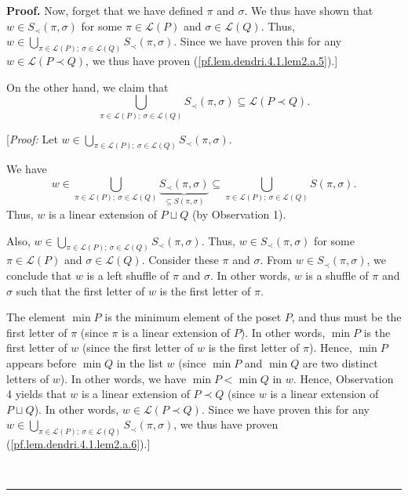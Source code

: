 \documentclass[numbers=enddot,12pt,final,onecolumn,notitlepage]{scrartcl}%
\theoremstyle{definition}
\newenvironment{proof}[1][Proof]{\noindent\textbf{#1.} }{\ \rule{0.5em}{0.5em}}
\newenvironment{verlong}{}{}
\begin{document}
\begin{verlong}
\begin{proof}
Now, forget that we have defined $\pi$ and $\sigma$. We thus have shown that
$w\in S_{\prec}\left(  \pi,\sigma\right)  $ for some $\pi\in\mathcal{L}\left(
P\right)  $ and $\sigma\in\mathcal{L}\left(  Q\right)  $. Thus, $w\in
\bigcup_{\pi\in\mathcal{L}\left(  P\right)  ;\ \sigma\in\mathcal{L}\left(
Q\right)  }S_{\prec}\left(  \pi,\sigma\right)  $. Since we have proven this
for any $w\in\mathcal{L}\left(  P\left.  \prec\right.  Q\right)  $, we thus
have proven (\ref{pf.lem.dendri.4.1.lem2.a.5}).]

On the other hand, we claim that
\begin{equation}
\bigcup_{\pi\in\mathcal{L}\left(  P\right)  ;\ \sigma\in\mathcal{L}\left(
Q\right)  }S_{\prec}\left(  \pi,\sigma\right)  \subseteq\mathcal{L}\left(
P\left.  \prec\right.  Q\right)  .\label{pf.lem.dendri.4.1.lem2.a.6}%
\end{equation}


[\textit{Proof:} Let $w\in\bigcup_{\pi\in\mathcal{L}\left(  P\right)
;\ \sigma\in\mathcal{L}\left(  Q\right)  }S_{\prec}\left(  \pi,\sigma\right)
$.

We have%
\[
w\in\bigcup_{\pi\in\mathcal{L}\left(  P\right)  ;\ \sigma\in\mathcal{L}\left(
Q\right)  }\underbrace{S_{\prec}\left(  \pi,\sigma\right)  }_{\subseteq
S\left(  \pi,\sigma\right)  }\subseteq\bigcup_{\pi\in\mathcal{L}\left(
P\right)  ;\ \sigma\in\mathcal{L}\left(  Q\right)  }S\left(  \pi
,\sigma\right)  .
\]
Thus, $w$ is a linear extension of $P\sqcup Q$ (by Observation 1).

Also, $w\in\bigcup_{\pi\in\mathcal{L}\left(  P\right)  ;\ \sigma
\in\mathcal{L}\left(  Q\right)  }S_{\prec}\left(  \pi,\sigma\right)  $.
Thus, $w\in S_{\prec}\left(  \pi,\sigma\right)  $ for some $\pi\in
\mathcal{L}\left(  P\right)  $ and $\sigma\in\mathcal{L}\left(  Q\right)  $.
Consider these $\pi$ and $\sigma$. From $w\in S_{\prec}\left(  \pi
,\sigma\right)  $, we conclude that $w$ is a left shuffle of $\pi$ and
$\sigma$. In other words, $w$ is a shuffle of $\pi$ and $\sigma$ such that the
first letter of $w$ is the first letter of $\pi$.

The element $\min P$ is the minimum element of the poset $P$, and thus must be
the first letter of $\pi$ (since $\pi$ is a linear extension of $P$). In other
words, $\min P$ is the first letter of $w$ (since the first letter of $w$ is
the first letter of $\pi$). Hence, $\min P$ appears before $\min Q$ in the
list $w$ (since $\min P$ and $\min Q$ are two distinct letters of $w$). In
other words, we have $\min P<\min Q$ in $w$. Hence, Observation 4 yields that
$w$ is a linear extension of $P\left.  \prec\right.  Q$ (since $w$ is a linear
extension of $P\sqcup Q$). In other words, $w\in\mathcal{L}\left(  P\left.
\prec\right.  Q\right)  $. Since we have proven this for any $w\in\bigcup
_{\pi\in\mathcal{L}\left(  P\right)  ;\ \sigma\in\mathcal{L}\left(  Q\right)
}S_{\prec}\left(  \pi,\sigma\right)  $, we thus have proven
(\ref{pf.lem.dendri.4.1.lem2.a.6}).]


\end{proof}
\end{verlong}
\end{document}
